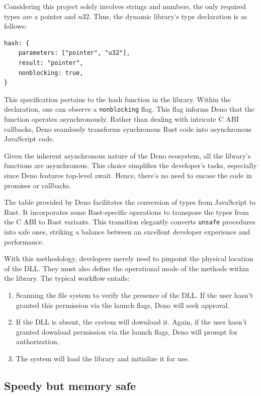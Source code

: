 \documentclass[10pt,journal,compsoc]{IEEEtran}
\begin{document}
Considering this project solely involves strings and numbers, the only required types are a pointer and u32. Thus, the dynamic library's type declaration is as follows:

\begin{lstlisting}
hash: {
    parameters: ["pointer", "u32"],
    result: "pointer",
    nonblocking: true,
}
\end{lstlisting}

This specification pertains to the hash function in the library. Within the declaration, one can observe a \verb|nonblocking| flag. This flag informs Deno that the function operates asynchronously. Rather than dealing with intricate C ABI callbacks, Deno seamlessly transforms synchronous Rust code into asynchronous JavaScript code.

Given the inherent asynchronous nature of the Deno ecosystem, all the library's functions are asynchronous. This choice simplifies the developer's tasks, especially since Deno features top-level await. Hence, there's no need to encase the code in promises or callbacks.

The table provided by Deno facilitates the conversion of types from JavaScript to Rust. It incorporates some Rust-specific operations to transpose the types from the C ABI to Rust variants. This transition elegantly converts \verb|unsafe| procedures into safe ones, striking a balance between an excellent developer experience and performance.

With this methodology, developers merely need to pinpoint the physical location of the DLL. They must also define the operational mode of the methods within the library. The typical workflow entails:

\begin{enumerate}
    \item Scanning the file system to verify the presence of the DLL. If the user hasn't granted this permission via the launch flags, Deno will seek approval.
    \item If the DLL is absent, the system will download it. Again, if the user hasn't granted download permission via the launch flags, Deno will prompt for authorization.
    \item The system will load the library and initialize it for use.
\end{enumerate}


\subsection{Speedy but memory safe}
\end{document}
